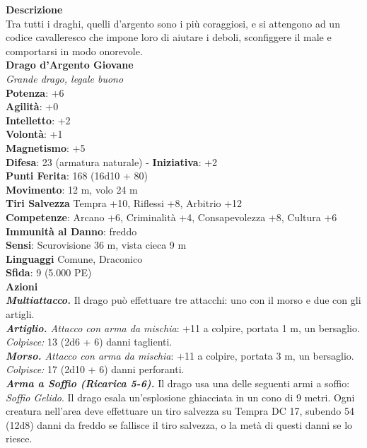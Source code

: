 \begin{multicols}{2}
\textbf{Descrizione}\\
Tra tutti i draghi, quelli d’argento sono i più coraggiosi, e si attengono ad un codice cavalleresco che impone loro di aiutare i deboli, sconfiggere il male e comportarsi in modo onorevole.\\
\medskip\textbf{Drago d'Argento Giovane}\\
\emph{Grande drago, legale buono}\\
\textbf{Potenza}: +6\\
\textbf{Agilità}: +0\\
\textbf{Intelletto}: +2\\
\textbf{Volontà}: +1\\
\textbf{Magnetismo}: +5\\
\textbf{Difesa}: 23 (armatura naturale) - \textbf{Iniziativa}: +2\\
\textbf{Punti Ferita}: 168 (16d10 + 80)\\
\textbf{Movimento}: 12 m, volo 24 m\\
\textbf{Tiri Salvezza} Tempra +10, Riflessi +8, Arbitrio +12\\
\textbf{Competenze}: Arcano +6, Criminalità +4, Consapevolezza +8, Cultura +6\\
\textbf{Immunità al Danno}: freddo\\
\textbf{Sensi}: Scurovisione 36 m, vista cieca 9 m\\
\textbf{Linguaggi} Comune, Draconico\\
\textbf{Sfida}: 9 (5.000 PE)\smallskip\\
\smallskip\textbf{Azioni}\\
\emph{\textbf{Multiattacco.}} Il drago può effettuare tre attacchi: uno con il morso e due con gli artigli.\\
\emph{\textbf{Artiglio.} Attacco con arma da mischia}: +11 a colpire, portata 1 m, un bersaglio.\\
\emph{Colpisce:} 13 (2d6 + 6) danni taglienti.\\
\emph{\textbf{Morso.} Attacco con arma da mischia}: +11 a colpire, portata 3 m, un bersaglio.\\
\emph{Colpisce:} 17 (2d10 + 6) danni perforanti.\\
\emph{\textbf{Arma a Soffio (Ricarica 5-6).}} Il drago usa una delle seguenti armi a soffio:\\
\emph{Soffio Gelido}. Il drago esala un'esplosione ghiacciata in un cono di 9 metri. Ogni creatura nell'area deve effettuare un tiro salvezza su Tempra DC 17, subendo 54 (12d8) danni da freddo se fallisce il tiro salvezza, o la metà di questi danni se lo riesce.\\

\end{multicols}
